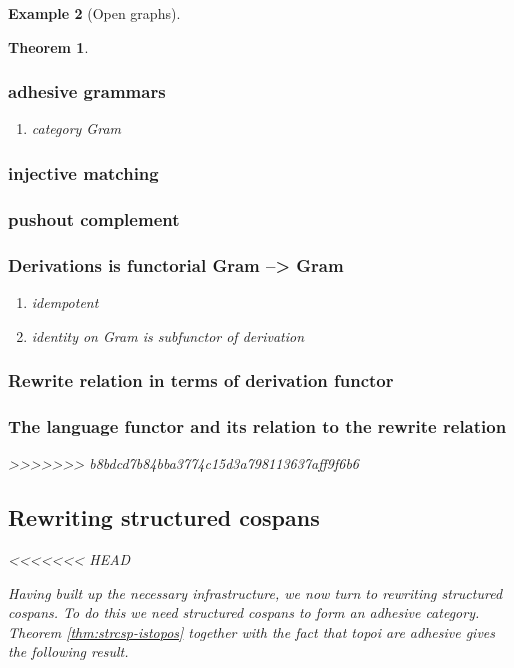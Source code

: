 \documentclass{amsart}
\newtheorem{theorem}{Theorem}[section]
\theoremstyle{remark}
\theoremstyle{definition}
\newtheorem{example}[theorem]{Example}
\begin{document}
\begin{example}[Open graphs]
{{\begin{theorem}
\subsubsection{adhesive grammars}
\label{sec-3-3-3}
\begin{enumerate}
\item category Gram
\label{sec-3-3-3-1}
\end{enumerate}
\subsubsection{injective matching}
\label{sec-3-3-4}
\subsubsection{pushout complement}
\label{sec-3-3-5}
\subsubsection{Derivations is functorial Gram --> Gram}
\label{sec-3-3-6}
\begin{enumerate}
\item idempotent
\label{sec-3-3-6-1}
\item identity on Gram is subfunctor of derivation
\label{sec-3-3-6-2}
\end{enumerate}
\subsubsection{Rewrite relation in terms of derivation functor}
\label{sec-3-3-7}
\subsubsection{The language functor and its relation to the rewrite relation}
\label{sec-3-3-8}
>>>>>>> b8bdcd7b84bba3774c15d3a798113637aff9f6b6


\subsection{Rewriting structured cospans}
<<<<<<< HEAD
\label{sec:Rewriting-StrCsp}

Having built up the necessary infrastructure, we now turn to rewriting
structured cospans. To do this we need structured cospans to form an
adhesive category. Theorem \ref{thm:strcsp-istopos} together with the
fact that topoi are adhesive \cite{LackSobo_ToposIsAdh} gives the
following result.


\end{theorem}}}
\end{example}
\end{document}
